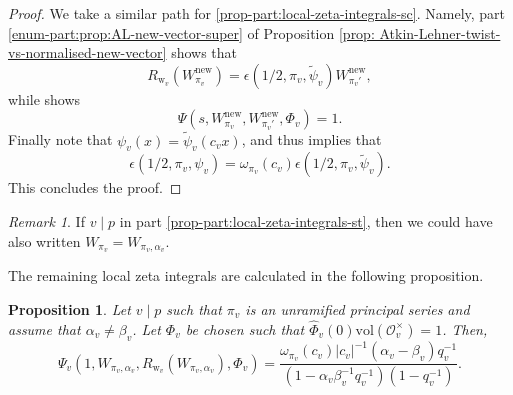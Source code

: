 \documentclass[10pt, twoside]{amsart}
\theoremstyle{plain}
\newtheorem{proposition}[theorem]{Proposition}
\theoremstyle{definition}
\theoremstyle{remark}
\newtheorem{remark}[theorem]{Remark}
\numberwithin{equation}{subsection}
\def\new{\mathrm{new}}
\def\scro{\mathscr O}
\def\scro{\mathscr O}
\begin{document}
\begin{proof}
We take a similar path for \ref{prop-part:local-zeta-integrals-sc}. Namely, part \ref{enum-part:prop:AL-new-vector-super} of Proposition \ref{prop: Atkin-Lehner-twist-vs-normalised-new-vector} shows that
\begin{equation*}
R_{{ \boldsymbol{\mathrm{w}}}_v}(W_{\pi_v}^{\new}) = \epsilon(1/2,\pi_v,\widetilde \psi_v)W_{\pi_v'}^{\new},
\end{equation*}
while \cite[p.\ 306]{Grenie} shows
\begin{equation*}
\Psi(s,W_{\pi_v}^{\new},W_{\pi_v'}^{\new},\Phi_v) = 1.
\end{equation*}
Finally note that $\psi_v(x) = \widetilde \psi_v(c_vx)$, and thus \cite[Eq.\ (10)]{Schmidt} implies that
\begin{equation*}
\epsilon(1/2,\pi_v,\psi_v) = \omega_{\pi_v}(c_v)\epsilon(1/2,\pi_v,\widetilde \psi_v).
\end{equation*} This concludes the proof. 
\end{proof}

\begin{remark}
If $v \mid p$ in part \ref{prop-part:local-zeta-integrals-st}, then we could have also written $W_{\pi_v} = W_{\pi_v,\alpha_v}$.
\end{remark}

The remaining local zeta integrals are calculated in the following proposition.

\begin{proposition}\label{prop:local-zeta-integrals-ps}
Let $v \mid p$ such that $\pi_v$ is an unramified principal series and assume that $\alpha_v \neq \beta_v$. Let $\Phi_v$ be chosen such that  $\widehat{\Phi}_v(0)\mathrm{vol}(\scro_v^\times) = 1$. Then,
\begin{equation*}
\Psi_v(1,W_{\pi_v,\alpha_v},R_{{ \boldsymbol{\mathrm{w}}}_v}(W_{\pi_v,\alpha_v}),\Phi_v) = \frac{\omega_{\pi_v}(c_v)|c_v|^{-1}(\alpha_v-\beta_v)q_v^{-1}}{(1-\alpha_v\beta_v^{-1}q_v^{-1})(1-q_v^{-1})}.
\end{equation*}
\end{proposition}
\end{document}
